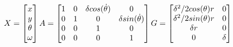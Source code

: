 \documentclass[twocolumn]{article}
\begin{document}
    \begin{equation*}      
     \resizebox{.99\columnwidth}{!}{ $ X=\begin{bmatrix} x \\ y \\ \theta \\ \omega \\ \end{bmatrix}  A=\begin{bmatrix}
            1 & 0 & \delta cos(\dot{\theta}) & 0      \\
            0 & 1 & 0      & \delta sin(\dot{\theta}) \\
            0 & 0 & 1      & 0      \\
            0 & 0 & 0      & 1      \\
        \end{bmatrix}
         G=\begin{bmatrix}
            \delta^2/2 cos(\theta)r & 0  \\
            \delta^2/2 sin(\theta)r & 0 \\
            \delta r    & 0          \\
            0 & \delta     \\
        \end{bmatrix}
    $ } \end{equation*}
\end{document}
